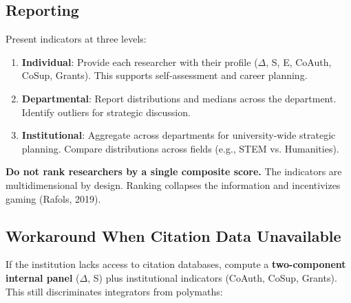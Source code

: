 \documentclass[
]{article}
\providecommand{\tightlist}{%
  \setlength{\itemsep}{0pt}\setlength{\parskip}{0pt}}
\begin{document}
\hypertarget{reporting}{%
\subsection{Reporting}\label{reporting}}

Present indicators at three levels:

\begin{enumerate}
\def\labelenumi{\arabic{enumi}.}
\tightlist
\item
  \textbf{Individual}: Provide each researcher with their profile
  (\(\Delta\), S, E, CoAuth, CoSup, Grants). This supports
  self-assessment and career planning.
\item
  \textbf{Departmental}: Report distributions and medians across the
  department. Identify outliers for strategic discussion.
\item
  \textbf{Institutional}: Aggregate across departments for
  university-wide strategic planning. Compare distributions across
  fields (e.g., STEM vs. Humanities).
\end{enumerate}

\textbf{Do not rank researchers by a single composite score.} The
indicators are multidimensional by design. Ranking collapses the
information and incentivizes gaming (Rafols, 2019).

\hypertarget{workaround-when-citation-data-unavailable}{%
\subsection{Workaround When Citation Data
Unavailable}\label{workaround-when-citation-data-unavailable}}

If the institution lacks access to citation databases, compute a
\textbf{two-component internal panel} (\(\Delta\), S) plus institutional
indicators (CoAuth, CoSup, Grants). This still discriminates integrators
from polymaths:
\end{document}
